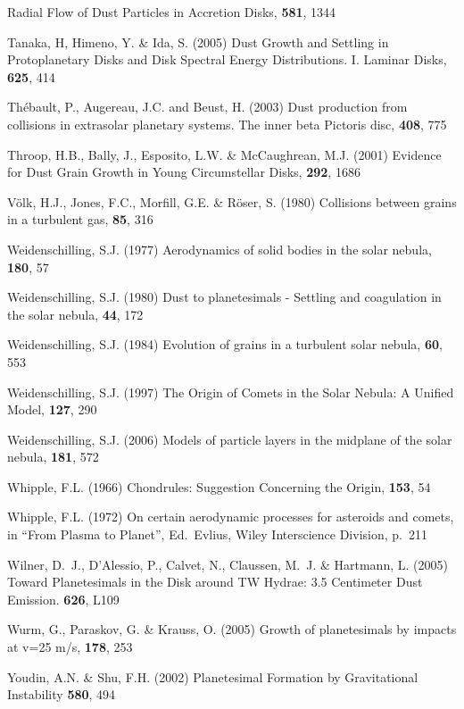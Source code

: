 \begin{literature}
  Radial Flow of Dust Particles in Accretion Disks,
  \apj \textbf{581}, 1344
\item Tanaka, H, Himeno, Y. \& Ida, S. (2005) 
  Dust Growth and Settling in Protoplanetary Disks and Disk Spectral 
  Energy Distributions. I. Laminar Disks,
  \apj \textbf{625}, 414
\item Th\'ebault, P., Augereau, J.C. and Beust, H. (2003) 
  Dust production from collisions in extrasolar planetary systems. 
  The inner beta  Pictoris disc,
  \aap \textbf{408}, 775
\item Throop, H.B., Bally, J., Esposito, L.W. \& McCaughrean, M.J.
  (2001) 
  Evidence for Dust Grain Growth in Young Circumstellar Disks, 
  \sci \textbf{292}, 1686
\item V\"olk, H.J., Jones, F.C., Morfill, G.E. \& R\"oser, S. (1980)
  Collisions between grains in a turbulent gas,
  \aap \textbf{85}, 316
\item Weidenschilling, S.J. (1977)
  Aerodynamics of solid bodies in the solar nebula, 
  \ica \textbf{180}, 57
\item Weidenschilling, S.J. (1980)
  Dust to planetesimals - Settling and coagulation in the solar nebula,
  \ica \textbf{44}, 172
\item Weidenschilling, S.J. (1984)
  Evolution of grains in a turbulent solar nebula,
  \ica \textbf{60}, 553
\item Weidenschilling, S.J. (1997)
  The Origin of Comets in the Solar Nebula: A Unified Model, 
  \ica \textbf{127}, 290
\item Weidenschilling, S.J. (2006)
  Models of particle layers in the midplane of the solar nebula, 
  \ica \textbf{181}, 572
\item Whipple, F.L. (1966)
  Chondrules: Suggestion Concerning the Origin,
  \sci \textbf{153}, 54
\item Whipple, F.L. (1972) 
  On certain aerodynamic processes for asteroids and comets,
  in ``From Plasma to Planet'', Ed.\ Evlius,
  Wiley Interscience Division, p.\ 211
\item Wilner, D.~J., D'Alessio, P., Calvet, N., Claussen, M.~J. 
  \& Hartmann, L. (2005) 
  Toward Planetesimals in the Disk around TW Hydrae: 3.5 Centimeter Dust
  Emission. 
  \apj \textbf{626}, L109
\item Wurm, G., Paraskov, G. \& Krauss, O. (2005)
  Growth of planetesimals by impacts at v=25 m/s,
  \ica \textbf{178}, 253
\item Youdin, A.N. \& Shu, F.H. (2002) 
  Planetesimal Formation by Gravitational Instability
  \apj \textbf{580}, 494
\end{literature}



